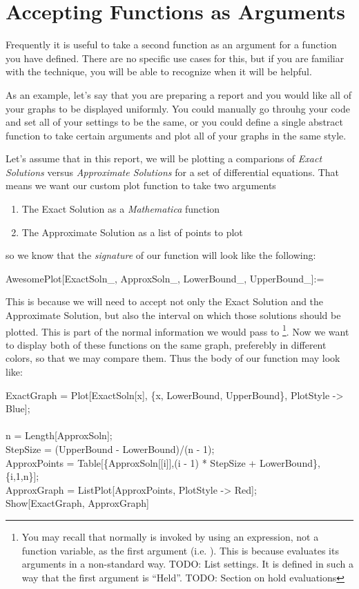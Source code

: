 \section{Accepting Functions as Arguments}

Frequently it is useful to take a second function as an argument for a function you have defined. There are no specific use cases for this, but if you are familiar with the technique, you will be able to recognize when it will be helpful.

As an example, let's say that you are preparing a report and you would like all of your graphs to be displayed uniformly. You could manually go throuhg your code and set all of your  settings to be the same, or you could define a single abstract function to take certain arguments and plot all of your graphs in the same style.

Let's assume that in this report, we will be plotting a comparions of \emph{Exact Solutions} versus \emph{Approximate Solutions} for a set of differential equations. That means we want our custom plot function to take two arguments
\begin{enumerate}
	   \item The Exact Solution as a \emph{Mathematica} function
	   \item The Approximate Solution as a list of points to plot
\end{enumerate}
so we know that the \emph{signature} of our function will look like the following:
\begin{code}
	   AwesomePlot[ExactSoln\_, ApproxSoln\_, LowerBound\_, UpperBound\_]:=
\end{code}

This is because we will need to accept not only the Exact Solution and the Approximate Solution, but also the interval on which those solutions should be plotted. This is part of the normal information we would pass to \footnote{You may recall that normally  is invoked by using an expression, not a function variable, as the first argument (i.e. ). This is because  evaluates its arguments in a non-standard way. TODO: List settings. It is defined in such a way that the first argument is ``Held''. TODO: Section on hold evaluations}. Now we want to display both of these functions on the same graph, preferebly in different colors, so that we may compare them. Thus the body of our function may look like:

\begin{code}
	   ExactGraph = Plot[ExactSoln[x], \{x, LowerBound, UpperBound\}, PlotStyle -> Blue];\\
	   \\
	   n = Length[ApproxSoln];\\
	   StepSize = (UpperBound - LowerBound)/(n - 1);\\
	   ApproxPoints = Table[\{ApproxSoln[[i]],(i - 1) * StepSize + LowerBound\},\{i,1,n\}];\\
	   ApproxGraph = ListPlot[ApproxPoints, PlotStyle -> Red];\\
	   Show[ExactGraph, ApproxGraph]
\end{code}


